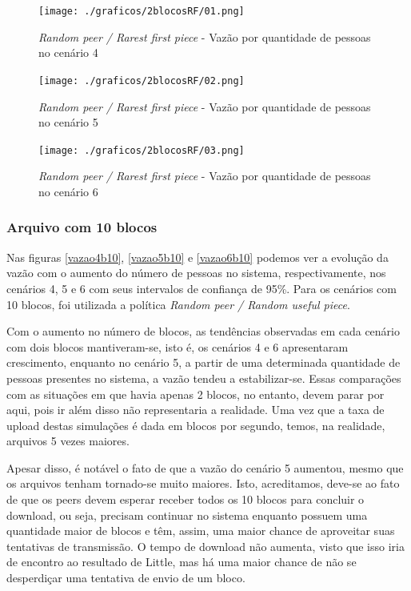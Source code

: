 \documentclass[a4paper,10pt]{article}
\begin{document}
\pagebreak

\begin{figure}
	\caption{\textit{Random peer /  Rarest first piece} - Vazão por quantidade de pessoas no cenário 4}
	\label{vazao4b2rf}
	\texttt{[image: ./graficos/2blocosRF/01.png]}
\end{figure}

\begin{figure}
	\caption{\textit{Random peer /  Rarest first piece} - Vazão por quantidade de pessoas no cenário 5}
	\label{vazao5b2rf}
	\texttt{[image: ./graficos/2blocosRF/02.png]}
\end{figure}

\clearpage
\pagebreak

\begin{figure}
	\caption{\textit{Random peer /  Rarest first piece} - Vazão por quantidade de pessoas no cenário 6}
	\label{vazao6b2rf}
	\texttt{[image: ./graficos/2blocosRF/03.png]}
\end{figure}

\pagebreak

\subsubsection{Arquivo com 10 blocos}

Nas figuras \ref{vazao4b10}, \ref{vazao5b10} e \ref{vazao6b10} podemos ver a evolução da vazão com o aumento do número de pessoas no sistema, respectivamente, nos cenários 4, 5 e 6 com seus intervalos de confiança de 95\%. Para os cenários com 10 blocos, foi utilizada a política \textit{Random peer / Random useful piece}.

Com o aumento no número de blocos, as tendências observadas em cada cenário com dois blocos mantiveram-se, isto é, os cenários 4 e 6 apresentaram crescimento, enquanto no cenário 5, a partir de uma determinada quantidade de pessoas presentes no sistema, a vazão tendeu a estabilizar-se. Essas comparações com as situações em que havia apenas 2 blocos, no entanto, devem parar por aqui, pois ir além disso não representaria a realidade. Uma vez que a taxa de upload destas simulações é dada em blocos por segundo, temos, na realidade, arquivos 5 vezes maiores.

Apesar disso, é notável o fato de que a vazão do cenário 5 aumentou, mesmo que os arquivos tenham tornado-se muito maiores. Isto, acreditamos, deve-se ao fato de que os peers devem esperar receber todos os 10 blocos para concluir o download, ou seja, precisam continuar no sistema enquanto possuem uma quantidade maior de blocos e têm, assim, uma maior chance de aproveitar suas tentativas de transmissão. O tempo de download não aumenta, visto que isso iria de encontro ao resultado de Little, mas há uma maior chance de não se desperdiçar uma tentativa de envio de um bloco.
\end{document}
